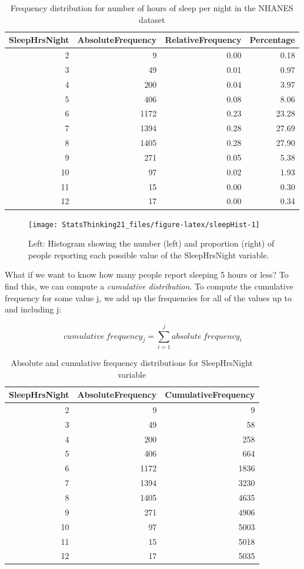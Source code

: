 \documentclass[
  12pt,
]{book}
\begin{document}
\begin{table}

\caption{\label{tab:sleepTable}Frequency distribution for number of hours of sleep per night in the NHANES dataset}
\centering
\begin{tabular}[t]{r|r|r|r}
\hline
SleepHrsNight & AbsoluteFrequency & RelativeFrequency & Percentage\\
\hline
2 & 9 & 0.00 & 0.18\\
\hline
3 & 49 & 0.01 & 0.97\\
\hline
4 & 200 & 0.04 & 3.97\\
\hline
5 & 406 & 0.08 & 8.06\\
\hline
6 & 1172 & 0.23 & 23.28\\
\hline
7 & 1394 & 0.28 & 27.69\\
\hline
8 & 1405 & 0.28 & 27.90\\
\hline
9 & 271 & 0.05 & 5.38\\
\hline
10 & 97 & 0.02 & 1.93\\
\hline
11 & 15 & 0.00 & 0.30\\
\hline
12 & 17 & 0.00 & 0.34\\
\hline
\end{tabular}
\end{table}

\begin{figure}
\texttt{[image: StatsThinking21\_files/figure-latex/sleepHist-1]} \caption{Left: Histogram showing the number (left) and proportion (right) of people reporting each possible value of the SleepHrsNight variable.}\label{fig:sleepHist}
\end{figure}

What if we want to know how many people report sleeping 5 hours or less? To find this, we can compute a \emph{cumulative distribution}. To compute the cumulative frequency for some value j, we add up the frequencies for all of the values up to and including j:

\[
cumulative\ frequency_j = \sum_{i=1}^{j}{absolute\ frequency_i}
\]

\newpage
\begin{table}

\caption{\label{tab:unnamed-chunk-7}Absolute and cumulative frequency distributions for SleepHrsNight variable}
\centering
\begin{tabular}[t]{r|r|r}
\hline
SleepHrsNight & AbsoluteFrequency & CumulativeFrequency\\
\hline
2 & 9 & 9\\
\hline
3 & 49 & 58\\
\hline
4 & 200 & 258\\
\hline
5 & 406 & 664\\
\hline
6 & 1172 & 1836\\
\hline
7 & 1394 & 3230\\
\hline
8 & 1405 & 4635\\
\hline
9 & 271 & 4906\\
\hline
10 & 97 & 5003\\
\hline
11 & 15 & 5018\\
\hline
12 & 17 & 5035\\
\hline
\end{tabular}
\end{table}
\end{document}
